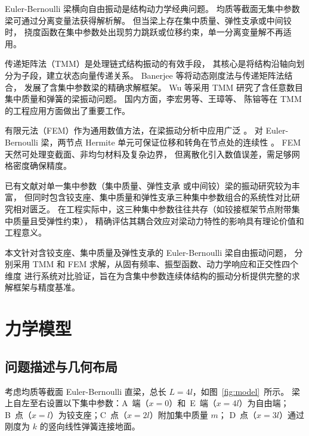 \documentclass[twoside,12pt]{ctexart}
\begin{document}
Euler-Bernoulli 梁横向自由振动是结构动力学经典问题。
均质等截面无集中参数梁可通过分离变量法获得解析解\cite{rao2007}。
但当梁上存在集中质量、弹性支承或中间铰时，
挠度函数在集中参数处出现剪力跳跃或位移约束，单一分离变量解不再适用。

传递矩阵法（TMM）是处理链式结构振动的有效手段，
其核心是将结构沿轴向划分为子段，建立状态向量传递关系\cite{pestel1963}。
Banerjee 等\cite{banerjee2001,banerjee2019}将动态刚度法与传递矩阵法结合，
发展了含集中参数梁的精确求解框架。
Wu 等\cite{wu2004,wuliu}采用 TMM 研究了含任意数目集中质量和弹簧的梁振动问题。
国内方面，李宏男等\cite{li1999}、王璋等\cite{wang2008}、
陈镕等\cite{chen2000}在 TMM 的工程应用方面做出了重要工作。

有限元法（FEM）作为通用数值方法，在梁振动分析中应用广泛
\cite{zienkiewicz2000,bathe2006,cook2007}。
对 Euler-Bernoulli 梁，两节点 Hermite 单元可保证位移和转角在节点处的连续性
\cite{hughes2012}。
FEM 天然可处理变截面、非均匀材料及复杂边界，
但离散化引入数值误差，需足够网格密度确保精度\cite{friswell2010}。

已有文献对单一集中参数（集中质量\cite{chang2005}、弹性支承
\cite{maurizi1988,li2002}或中间铰\cite{wang2011}）梁的振动研究较为丰富，
但同时包含铰支座、集中质量和弹性支承三种集中参数组合的系统性对比研究相对匮乏。
在工程实际中，这三种集中参数往往共存（如铰接框架节点附带集中质量且受弹性约束），
精确评估其耦合效应对梁动力特性的影响具有理论价值和工程意义。

本文针对含铰支座、集中质量及弹性支承的 Euler-Bernoulli 梁自由振动问题，
分别采用 TMM 和 FEM 求解，从固有频率、振型函数、动力学响应和正交性四个维度
进行系统对比验证，旨在为含集中参数连续体结构的振动分析提供完整的求解框架与精度基准。

\section{力学模型}

\subsection{问题描述与几何布局}

考虑均质等截面 Euler-Bernoulli 直梁，总长 $L=4l$，如图~\ref{fig:model}~所示。
梁上自左至右设置以下集中参数：A~端（$x=0$）和~E~端（$x=4l$）为自由端；
B~点（$x=l$）为铰支座；C~点（$x=2l$）附加集中质量 $m$；
D~点（$x=3l$）通过刚度为 $k$ 的竖向线性弹簧连接地面。
\end{document}
